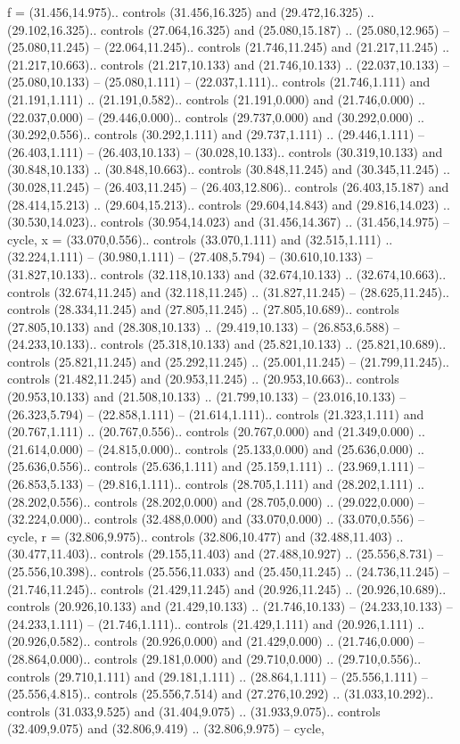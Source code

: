 {f} = {(31.456,14.975).. controls (31.456,16.325) and (29.472,16.325) .. (29.102,16.325).. controls (27.064,16.325) and (25.080,15.187) .. (25.080,12.965) -- (25.080,11.245) -- (22.064,11.245).. controls (21.746,11.245) and (21.217,11.245) .. (21.217,10.663).. controls (21.217,10.133) and (21.746,10.133) .. (22.037,10.133) -- (25.080,10.133) -- (25.080,1.111) -- (22.037,1.111).. controls (21.746,1.111) and (21.191,1.111) .. (21.191,0.582).. controls (21.191,0.000) and (21.746,0.000) .. (22.037,0.000) -- (29.446,0.000).. controls (29.737,0.000) and (30.292,0.000) .. (30.292,0.556).. controls (30.292,1.111) and (29.737,1.111) .. (29.446,1.111) -- (26.403,1.111) -- (26.403,10.133) -- (30.028,10.133).. controls (30.319,10.133) and (30.848,10.133) .. (30.848,10.663).. controls (30.848,11.245) and (30.345,11.245) .. (30.028,11.245) -- (26.403,11.245) -- (26.403,12.806).. controls (26.403,15.187) and (28.414,15.213) .. (29.604,15.213).. controls (29.604,14.843) and (29.816,14.023) .. (30.530,14.023).. controls (30.954,14.023) and (31.456,14.367) .. (31.456,14.975) -- cycle},
{x} = {(33.070,0.556).. controls (33.070,1.111) and (32.515,1.111) .. (32.224,1.111) -- (30.980,1.111) -- (27.408,5.794) -- (30.610,10.133) -- (31.827,10.133).. controls (32.118,10.133) and (32.674,10.133) .. (32.674,10.663).. controls (32.674,11.245) and (32.118,11.245) .. (31.827,11.245) -- (28.625,11.245).. controls (28.334,11.245) and (27.805,11.245) .. (27.805,10.689).. controls (27.805,10.133) and (28.308,10.133) .. (29.419,10.133) -- (26.853,6.588) -- (24.233,10.133).. controls (25.318,10.133) and (25.821,10.133) .. (25.821,10.689).. controls (25.821,11.245) and (25.292,11.245) .. (25.001,11.245) -- (21.799,11.245).. controls (21.482,11.245) and (20.953,11.245) .. (20.953,10.663).. controls (20.953,10.133) and (21.508,10.133) .. (21.799,10.133) -- (23.016,10.133) -- (26.323,5.794) -- (22.858,1.111) -- (21.614,1.111).. controls (21.323,1.111) and (20.767,1.111) .. (20.767,0.556).. controls (20.767,0.000) and (21.349,0.000) .. (21.614,0.000) -- (24.815,0.000).. controls (25.133,0.000) and (25.636,0.000) .. (25.636,0.556).. controls (25.636,1.111) and (25.159,1.111) .. (23.969,1.111) -- (26.853,5.133) -- (29.816,1.111).. controls (28.705,1.111) and (28.202,1.111) .. (28.202,0.556).. controls (28.202,0.000) and (28.705,0.000) .. (29.022,0.000) -- (32.224,0.000).. controls (32.488,0.000) and (33.070,0.000) .. (33.070,0.556) -- cycle},
{r} = {(32.806,9.975).. controls (32.806,10.477) and (32.488,11.403) .. (30.477,11.403).. controls (29.155,11.403) and (27.488,10.927) .. (25.556,8.731) -- (25.556,10.398).. controls (25.556,11.033) and (25.450,11.245) .. (24.736,11.245) -- (21.746,11.245).. controls (21.429,11.245) and (20.926,11.245) .. (20.926,10.689).. controls (20.926,10.133) and (21.429,10.133) .. (21.746,10.133) -- (24.233,10.133) -- (24.233,1.111) -- (21.746,1.111).. controls (21.429,1.111) and (20.926,1.111) .. (20.926,0.582).. controls (20.926,0.000) and (21.429,0.000) .. (21.746,0.000) -- (28.864,0.000).. controls (29.181,0.000) and (29.710,0.000) .. (29.710,0.556).. controls (29.710,1.111) and (29.181,1.111) .. (28.864,1.111) -- (25.556,1.111) -- (25.556,4.815).. controls (25.556,7.514) and (27.276,10.292) .. (31.033,10.292).. controls (31.033,9.525) and (31.404,9.075) .. (31.933,9.075).. controls (32.409,9.075) and (32.806,9.419) .. (32.806,9.975) -- cycle},
